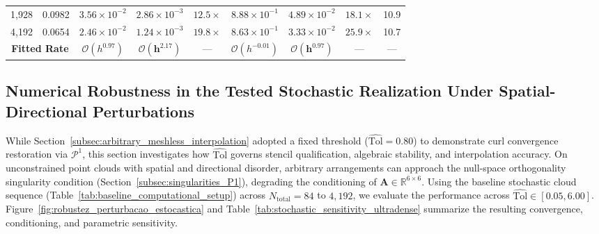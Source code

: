 \documentclass[preprint,12pt]{elsarticle}
\begin{document}
\begin{table}[!htbp]
{\begin{tabular}{@{} c c c c c c c c c @{}}
            1{,}928                                  & 0.0982                  & $3.56 \times 10^{-2}$                                 & $2.86 \times 10^{-3}$                                & $\mathbf{12.5\times}$    & $8.88 \times 10^{-1}$            & $4.89 \times 10^{-2}$ & $\mathbf{18.1\times}$ & 10.9              \\
            4{,}192                                  & 0.0654                  & $2.46 \times 10^{-2}$                                 & $1.24 \times 10^{-3}$                                & $\mathbf{19.8\times}$    & $8.63 \times 10^{-1}$            & $3.33 \times 10^{-2}$ & $\mathbf{25.9\times}$ & 10.7              \\
            \midrule
            \multicolumn{2}{c}{\textbf{Fitted Rate}} & $\mathcal{O}(h^{0.97})$ & $\mathbf{\mathcal{O}(h^{2.17})}$                      & ---                                                  & $\mathcal{O}(h^{-0.01})$ & $\mathbf{\mathcal{O}(h^{0.97})}$ & ---                   & ---                                       \\
            \bottomrule
        \end{tabular}%
    }
\end{table}

\subsection{Numerical Robustness in the Tested Stochastic Realization Under Spatial-Directional Perturbations}
\label{subsec:stochastic_perturbations}

While Section~\ref{subsec:arbitrary_meshless_interpolation} adopted a fixed threshold ($\widehat{\mathrm{Tol}} = 0.80$) to demonstrate curl convergence restoration via $\mathcal{P}^1$, this section investigates how $\widehat{\mathrm{Tol}}$ governs stencil qualification, algebraic stability, and interpolation accuracy. On unconstrained point clouds with spatial and directional disorder, arbitrary arrangements can approach the null-space orthogonality singularity condition (Section~\ref{subsec:singularities_P1}), degrading the conditioning of $\mathbf{A} \in \mathbb{R}^{6 \times 6}$. Using the baseline stochastic cloud sequence (Table~\ref{tab:baseline_computational_setup}) across $N_{\mathrm{total}} = 84$ to $4{,}192$, we evaluate the performance across $\widehat{\mathrm{Tol}} \in [0.05, 6.00]$. Figure~\ref{fig:robustez_perturbacao_estocastica} and Table~\ref{tab:stochastic_sensitivity_ultradense} summarize the resulting convergence, conditioning, and parametric sensitivity.
\end{document}
